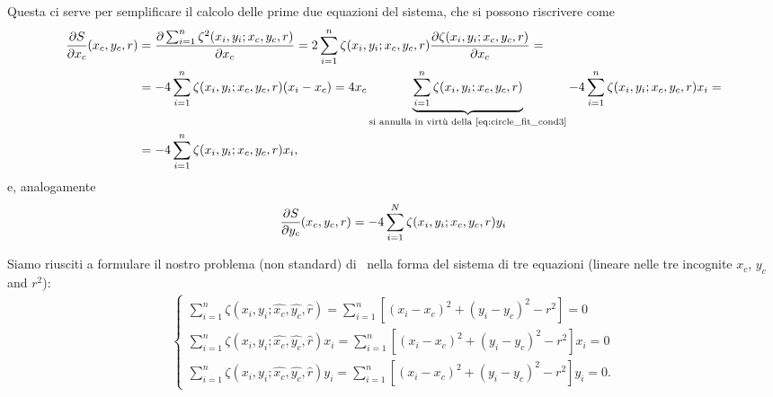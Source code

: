 Questa ci serve per semplificare il calcolo delle prime due equazioni del sistema,
che si possono riscrivere come
\begin{align*}
  \pd{S}{x_c}{x_c, y_c, r} &= \pd{\sum_{i=1}^n \zeta^2(x_i, y_i; x_c, y_c, r)}{x_c}{} =
  2 \sum_{i=1}^n \zeta(x_i, y_i; x_c, y_c, r) \pd{\zeta(x_i, y_i; x_c, y_c, r)}{x_c}{} =\\
  & = -4 \sum_{i=1}^n \zeta(x_i, y_i; x_c, y_c, r) (x_i - x_c) =
  4x_c \underbrace{\sum_{i=1}^n \zeta(x_i, y_i; x_c, y_c, r)}_{
    \text{si annulla in virtù della~\eqref{eq:circle_fit_cond3}}
    } - 4\sum_{i=1}^n \zeta(x_i, y_i; x_c, y_c, r)x_i =\\
  &= - 4\sum_{i=1}^n \zeta(x_i, y_i; x_c, y_c, r)x_i,
\end{align*}
e, analogamente
\begin{align*}
  \pd{S}{y_c}{x_c, y_c, r} = - 4\sum_{i=1}^N \zeta(x_i, y_i; x_c, y_c, r)y_i
\end{align*}

Siamo riusciti a formulare il nostro problema (non standard) di \bestfit\
nella forma del sistema di tre equazioni (lineare nelle tre incognite
$x_c$, $y_c$ and $r^2$):
\begin{align*}
  \begin{cases}
    \displaystyle \sum_{i=1}^n \zeta(x_i, y_i; \hat{x_c}, \hat{y_c}, \hat{r}) =
      \sum_{i=1}^n \left[ (x_i - x_c)^2 + (y_i - y_c)^2 - r^2 \right] = 0\\
    \displaystyle \sum_{i=1}^n \zeta(x_i, y_i; \hat{x_c}, \hat{y_c}, \hat{r})x_i =
     \sum_{i=1}^n \left[ (x_i - x_c)^2 + (y_i - y_c)^2 - r^2 \right] x_i = 0\\
    \displaystyle \sum_{i=1}^n \zeta(x_i, y_i; \hat{x_c}, \hat{y_c}, \hat{r})y_i =
     \sum_{i=1}^n \left[ (x_i - x_c)^2 + (y_i - y_c)^2 - r^2 \right] y_i = 0.
  \end{cases}
\end{align*}

